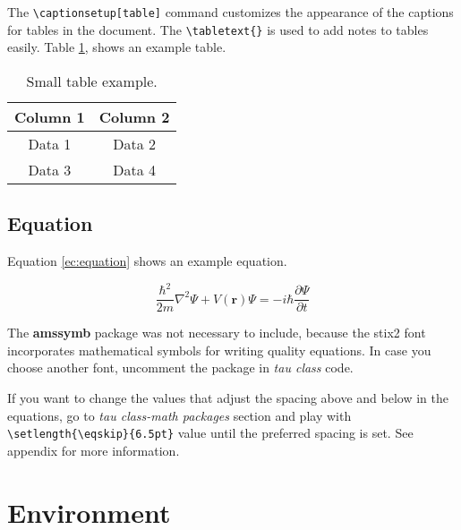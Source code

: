 \documentclass[9pt,a4paper,twoside]{tau}
\begin{document}
            The \verb*|\captionsetup[table]| command customizes the appearance of the captions for tables in the document. The \verb*|\tabletext{}| is used to add notes to tables easily. Table \ref{tab:table}, shows an example table.
            
            \begin{table}[H]
                \centering
                \caption{Small table example.}
    		\label{tab:table}
                \begin{tabular}{cc}
            	\toprule
                    \textbf{Column 1} & \textbf{Column 2} \\
                    \midrule
                    Data 1 & Data 2 \\
                    Data 3 & Data 4 \\
                    \bottomrule
                \end{tabular}
                    
                    
            \end{table}

    \subsection{Equation}
    
        Equation \ref{ec:equation} shows an example equation. 

	\begin{equation} \label{ec:equation}
            \frac{\hbar^2}{2m}\nabla^2\Psi + V(\mathbf{r})\Psi = -i\hbar \frac{\partial\Psi}{\partial t}
	\end{equation} 

        The \textbf{amssymb} package was not necessary to include, because the stix2 font incorporates mathematical symbols for writing quality equations. In case you choose another font, uncomment the package in \textit{tau class} code.

        If you want to change the values that adjust the spacing above and below in the equations, go to \textit{tau class-math packages} section and play with \verb|\setlength{\eqskip}{6.5pt}| value until the preferred spacing is set. See appendix for more information.

\section{Environment}
\end{document}
